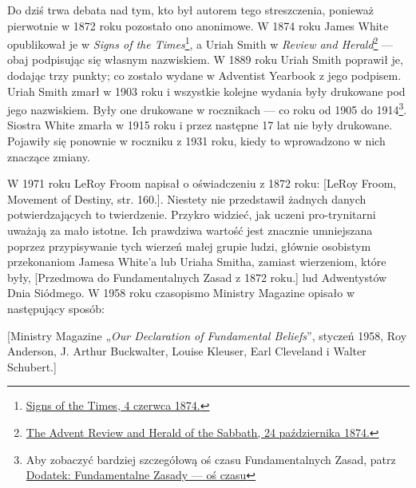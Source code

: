 Do dziś trwa debata nad tym, kto był autorem tego streszczenia, ponieważ pierwotnie w 1872 roku pozostało ono anonimowe. W 1874 roku James White opublikował je w \textit{Signs of the Times}\footnote{\href{https://adventistdigitallibrary.org/adl-364148/signs-times-june-4-1874}{Signs of the Times, 4 czerwca 1874.}}, a Uriah Smith w \textit{Review and Herald}\footnote{\href{http://documents.adventistarchives.org/Periodicals/RH/RH18741124-V44-22.pdf}{The Advent Review and Herald of the Sabbath, 24 października 1874.}} — obaj podpisując się własnym nazwiskiem. W 1889 roku Uriah Smith poprawił je, dodając trzy punkty; co zostało wydane w Adventist Yearbook  z jego podpisem. Uriah Smith zmarł w 1903 roku i wszystkie kolejne wydania  były drukowane pod jego nazwiskiem. Były one drukowane w rocznikach — co roku od 1905 do 1914\footnote{Aby zobaczyć bardziej szczegółową oś czasu Fundamentalnych Zasad, patrz \hyperref[appendix:timeline]{Dodatek: Fundamentalne Zasady — oś czasu}}. Siostra White zmarła w 1915 roku i przez następne 17 lat  nie były drukowane. Pojawiły się ponownie w roczniku z 1931 roku, kiedy to wprowadzono w nich znaczące zmiany.

W 1971 roku LeRoy Froom napisał o oświadczeniu z 1872 roku: [LeRoy Froom, Movement of Destiny, str. 160.]. Niestety nie przedstawił żadnych danych potwierdzających to twierdzenie. Przykro widzieć, jak uczeni pro-trynitarni uważają  za mało istotne. Ich prawdziwa wartość jest znacznie umniejszana poprzez przypisywanie tych wierzeń małej grupie ludzi, głównie osobistym przekonaniom Jamesa White'a lub Uriaha Smitha, zamiast wierzeniom, które były, [Przedmowa do Fundamentalnych Zasad z 1872 roku.] lud Adwentystów Dnia Siódmego. W 1958 roku czasopismo Ministry Magazine opisało  w następujący sposób:

[Ministry Magazine „\textit{Our Declaration of Fundamental Beliefs}”, styczeń 1958, Roy Anderson, J. Arthur Buckwalter, Louise Kleuser, Earl Cleveland i Walter Schubert.]

